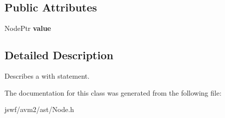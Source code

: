 \subsection*{Public Attributes}
\begin{DoxyCompactItemize}
\item 
\hypertarget{classjswf_1_1avm2_1_1ast_1_1_with_node_a5acabc7fe0a13b308867b7d6e5fe24ce}{Node\+Ptr {\bfseries value}}\label{classjswf_1_1avm2_1_1ast_1_1_with_node_a5acabc7fe0a13b308867b7d6e5fe24ce}

\end{DoxyCompactItemize}


\subsection{Detailed Description}
Describes a {\ttfamily with} statement. 

The documentation for this class was generated from the following file\+:\begin{DoxyCompactItemize}
\item 
jswf/avm2/ast/Node.\+h\end{DoxyCompactItemize}

